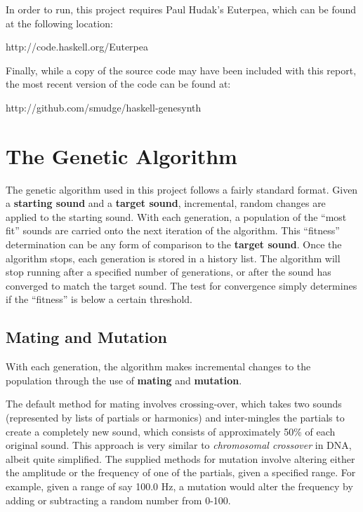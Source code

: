 \documentclass[11pt]{article}
\begin{document}
In order to run, this project requires Paul Hudak's Euterpea, which can be found at the following location:
\begin{code}
http://code.haskell.org/Euterpea
\end{code}

Finally, while a copy of the source code may have been included with this report, the most recent version of the code can be found at:
\begin{code}
http://github.com/smudge/haskell-genesynth
\end{code}

\section{The Genetic Algorithm}

The genetic algorithm used in this project follows a fairly standard format. Given a {\bf starting sound} and a {\bf target sound}, incremental, random changes are applied to the starting sound. With each generation, a population of the ``most fit'' sounds are carried onto the next iteration of the algorithm. This ``fitness'' determination can be any form of comparison to the {\bf target sound}. Once the algorithm stops, each generation is stored in a history list. The algorithm will stop running after a specified number of generations, or after the sound has converged to match the target sound. The test for convergence simply determines if the ``fitness'' is below a certain threshold.

\subsection{Mating and Mutation}

With each generation, the algorithm makes incremental changes to the population through the use of {\bf mating} and {\bf mutation}. 

The default method for mating involves crossing-over, which takes two sounds (represented by lists of partials or harmonics) and inter-mingles the partials to create a completely new sound, which consists of approximately 50\% of each original sound. This approach is very similar to \emph{chromosomal crossover} in DNA, albeit quite simplified.
The supplied methods for mutation involve altering either the amplitude or the frequency of one of the partials, given a specified range. For example, given a range of say 100.0 Hz, a mutation would alter the frequency by adding or subtracting a random number from 0-100.
\end{document}
